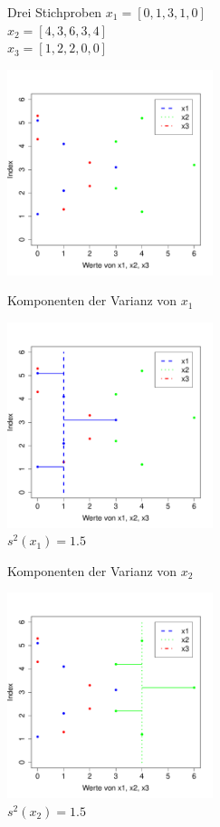 \begin{frame}
  {Drei Stichproben}
  $x_1=[0, 1, 3, 1, 0]$\\
  $x_2=[4, 3, 6, 3, 4]$\\
  $x_3=[1, 2, 2, 0, 0]$\\

  \vspace{-0.5cm}
  \begin{center}
    \includegraphics[width=0.45\textwidth]{graphics/anova_points}
  \end{center}
\end{frame}


\begin{frame}
  {Komponenten der Varianz von $x_1$}
  
  \begin{center}
    \includegraphics[width=0.45\textwidth]{graphics/anova_var_x1}\\
    $s^2(x_1)=1.5$
  \end{center}
\end{frame}

\begin{frame}
  {Komponenten der Varianz von $x_2$}
  
  \begin{center}
    \includegraphics[width=0.45\textwidth]{graphics/anova_var_x2}\\
    $s^2(x_2)=1.5$
  \end{center}
\end{frame}

